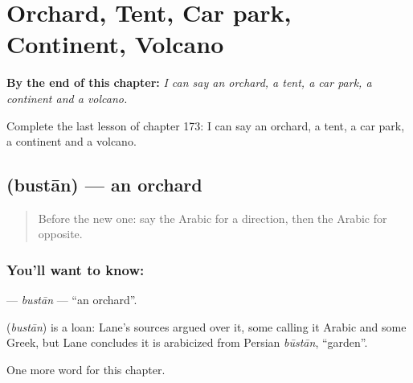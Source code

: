 
\chapter{Orchard, Tent, Car park, Continent, Volcano}
\label{ch:ar-orchard-tent-car-park-continent-volcano}

\begin{chapteropening}
\textbf{By the end of this chapter:} \emph{I can say an orchard, a tent, a car park, a continent and a volcano.}

Complete the last lesson of chapter 173: I can say an orchard, a tent, a car park, a continent and a volcano.
\end{chapteropening}

\section[\texorpdfstring{\ar{بستان} (bustān)}{بستان (bustān)}]{ (bustān) — an orchard}

\label{lesson:AR-C173-bustan}



\begin{quote}
Before the new one: say the Arabic for a direction, then the Arabic for opposite.
\end{quote}

\subsection*{You'll want to know: }
\textbf{} — \emph{bustān} — \textquotedblleft{}an orchard\textquotedblright{}.

\begin{cousinweb}
\textbf{} (\emph{bustān}) is a loan: Lane's sources argued over it, some calling it Arabic and some Greek, but Lane concludes it is arabicized from Persian \emph{būstān}, \textquotedblleft{}garden\textquotedblright{}.
\end{cousinweb}

\begin{grammarlens}[title={What you've built}]
One more word for this chapter.
\end{grammarlens}

